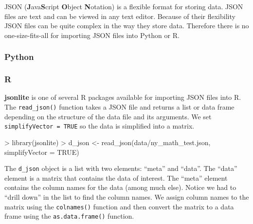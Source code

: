 \documentclass[
]{book}
\newenvironment{Shaded}{\begin{snugshade}}{\end{snugshade}}
\newcommand{\AttributeTok}[1]{\textcolor[rgb]{0.77,0.63,0.00}{#1}}
\newcommand{\ConstantTok}[1]{\textcolor[rgb]{0.00,0.00,0.00}{#1}}
\newcommand{\FunctionTok}[1]{\textcolor[rgb]{0.00,0.00,0.00}{#1}}
\newcommand{\NormalTok}[1]{#1}
\newcommand{\OtherTok}[1]{\textcolor[rgb]{0.56,0.35,0.01}{#1}}
\newcommand{\SpecialCharTok}[1]{\textcolor[rgb]{0.00,0.00,0.00}{#1}}
\newcommand{\StringTok}[1]{\textcolor[rgb]{0.31,0.60,0.02}{#1}}
\begin{document}
JSON (\textbf{J}ava\textbf{S}cript \textbf{O}bject \textbf{N}otation) is a flexible format for storing data. JSON files are text and can be viewed in any text editor. Because of their flexibility JSON files can be quite complex in the way they store data. Therefore there is no one-size-fits-all for importing JSON files into Python or R.

\hypertarget{python-12}{%
\subsubsection*{Python}\label{python-12}}

\hypertarget{r-12}{%
\subsubsection*{R}\label{r-12}}

\textbf{jsonlite} is one of several R packages available for importing JSON files into R. The \texttt{read\_json()} function takes a JSON file and returns a list or data frame depending on the structure of the data file and its arguments. We set \texttt{simplifyVector\ =\ TRUE} so the data is simplified into a matrix.

\begin{Shaded}
\begin{Highlighting}[]
\SpecialCharTok{\textgreater{}} \FunctionTok{library}\NormalTok{(jsonlite)}
\SpecialCharTok{\textgreater{}}\NormalTok{ d\_json }\OtherTok{\textless{}{-}} \FunctionTok{read\_json}\NormalTok{(}\StringTok{\textquotesingle{}data/ny\_math\_test.json\textquotesingle{}}\NormalTok{, }\AttributeTok{simplifyVector =} \ConstantTok{TRUE}\NormalTok{)}
\end{Highlighting}
\end{Shaded}

The \texttt{d\_json} object is a list with two elements: ``meta'' and ``data''. The ``data'' element is a matrix that contains the data of interest. The ``meta'' element contains the column names for the data (among much else). Notice we had to ``drill down'' in the list to find the column names. We assign column names to the matrix using the \texttt{colnames()} function and then convert the matrix to a data frame using the \texttt{as.data.frame()} function.
\end{document}

